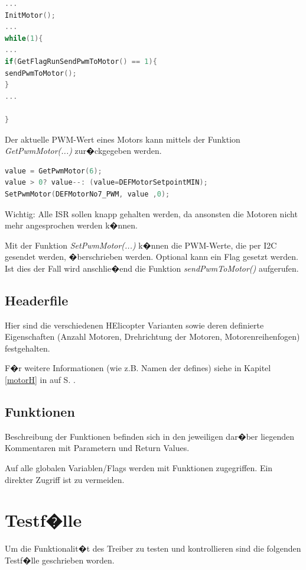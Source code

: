 \begin{lstlisting}[language=C++]
...
InitMotor();
...
while(1){
...
if(GetFlagRunSendPwmToMotor() == 1){
sendPwmToMotor();
}
...

}
\end{lstlisting}
Der aktuelle PWM-Wert eines Motors kann mittels der Funktion \emph{GetPwmMotor(...)} zur�ckgegeben werden.

\begin{lstlisting}[language=C++]
value = GetPwmMotor(6);
value > 0? value--: (value=DEFMotorSetpointMIN);
SetPwmMotor(DEFMotorNo7_PWM, value ,0);
\end{lstlisting}

Wichtig: Alle ISR sollen knapp gehalten werden, da ansonsten die Motoren nicht mehr angesprochen werden k�nnen.

Mit der Funktion \emph{SetPwmMotor(...)} k�nnen die PWM-Werte, die  per I2C gesendet werden, �berschrieben werden. Optional kann ein Flag gesetzt werden. Ist dies der Fall wird anschlie�end die Funktion \emph{sendPwmToMotor()} aufgerufen.

\subsection{Headerfile}

Hier sind die verschiedenen HElicopter Varianten sowie deren definierte Eigenschaften (Anzahl Motoren, Drehrichtung der Motoren, Motorenreihenfogen) festgehalten.

F�r weitere Informationen (wie z.B. Namen der defines) siehe in Kapitel \ref{motorH} in   auf S.\pageref{motorH} .

\subsection{Funktionen}

Beschreibung der Funktionen befinden sich in den jeweiligen dar�ber liegenden Kommentaren mit Parametern und Return Values.

Auf alle globalen Variablen/Flags werden mit Funktionen zugegriffen. Ein direkter Zugriff ist zu vermeiden.


\section{Testf�lle}

Um die Funktionalit�t des Treiber zu testen und kontrollieren sind die folgenden Testf�lle geschrieben worden. 


